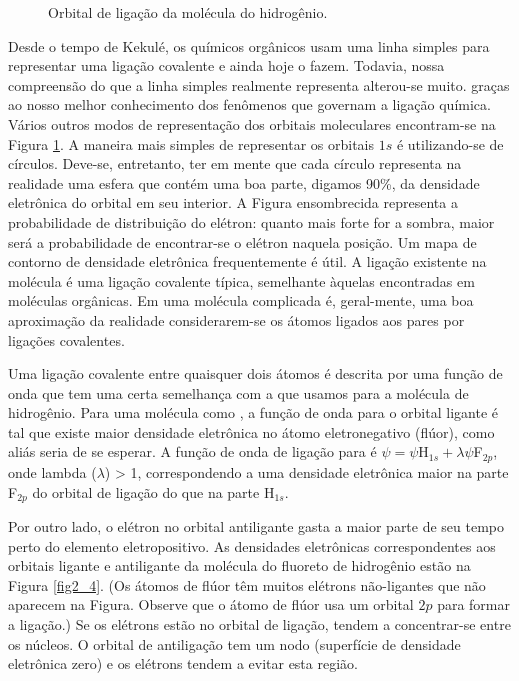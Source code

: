 \begin{figure}[H]
    \centering
    \caption{Orbital de ligação da molécula do hidrogênio.}
    \label{fig2_3}
\end{figure}

Desde o tempo de Kekulé, os químicos orgânicos usam uma linha simples para representar uma ligação covalente e ainda hoje o fazem. Todavia, nossa compreensão do que a linha simples realmente representa alterou-se muito. graças ao nosso melhor conhecimento dos fenômenos que governam a ligação química. Vários outros modos de representação dos orbitais moleculares encontram-se na Figura \ref{fig2_3}. A maneira mais simples de representar os orbitais $1s$ é utilizando-se de círculos. Deve-se, entretanto, ter em mente que cada círculo representa na realidade uma esfera que contém uma boa parte, digamos 90\%, da densidade eletrônica do orbital em seu interior. A Figura ensombrecida representa a probabilidade de distribuição do elétron: quanto mais forte for a sombra, maior será a probabilidade de encontrar-se o elétron naquela posição. Um mapa de contorno de densidade eletrônica frequentemente é útil. A ligação existente na molécula  é uma ligação covalente típica, semelhante àquelas encontradas em moléculas orgânicas. Em uma molécula complicada é, geral-mente, uma boa aproximação da realidade considerarem-se os átomos ligados aos pares por ligações covalentes. 

Uma ligação covalente entre quaisquer dois átomos é descrita por uma função de onda que tem uma certa semelhança com a que usamos para a molécula de hidrogênio. Para uma molécula como , a função de onda para o orbital ligante é tal que existe maior densidade eletrônica no átomo eletronegativo (flúor), como aliás seria de se esperar. A função de onda de ligação para  é $\psi = \psi$H$_{1s} + \lambda\psi$F$_{2p}$, onde lambda ($\lambda$) > 1, correspondendo a uma densidade eletrônica maior na parte F$_{2p}$ do orbital de ligação do que na parte H$_{1s}$. 

Por outro lado, o elétron no orbital antiligante gasta a maior parte de seu tempo perto do elemento eletropositivo. As densidades eletrônicas correspondentes aos orbitais ligante e antiligante da molécula do fluoreto de hidrogênio estão na Figura \ref{fig2_4}. (Os átomos de flúor têm muitos elétrons não-ligantes que não aparecem na Figura. Observe que o átomo de flúor usa um orbital $2p$ para formar a ligação.) Se os elétrons estão no orbital de ligação, tendem a concentrar-se entre os núcleos. O orbital de antiligação tem um nodo (superfície de densidade eletrônica zero) e os elétrons tendem a evitar esta região. 

